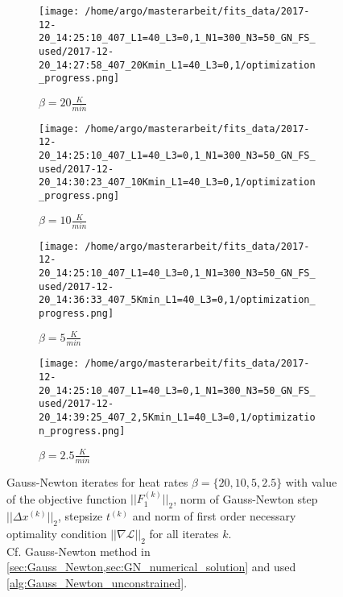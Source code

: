 \documentclass{scrartcl}[12pt, halfparskip]
\numberwithin{equation}{section}
\numberwithin{figure}{section}
\numberwithin{table}{section}
\begin{document}
\begin{figure}[H]
	\begin{subfigure}{0.49\textwidth}
		\texttt{[image: /home/argo/masterarbeit/fits\_data/2017-12-20\_14:25:10\_407\_L1=40\_L3=0,1\_N1=300\_N3=50\_GN\_FS\_used/2017-12-20\_14:27:58\_407\_20Kmin\_L1=40\_L3=0,1/optimization\_progress.png]}
		\caption{$\beta = 20 \frac{K}{min}$}
	\end{subfigure}
	\begin{subfigure}{0.49\textwidth}
		\texttt{[image: /home/argo/masterarbeit/fits\_data/2017-12-20\_14:25:10\_407\_L1=40\_L3=0,1\_N1=300\_N3=50\_GN\_FS\_used/2017-12-20\_14:30:23\_407\_10Kmin\_L1=40\_L3=0,1/optimization\_progress.png]}
		\caption{$\beta = 10 \frac{K}{min}$}
	\end{subfigure}
	\begin{subfigure}{0.49\textwidth}
		\texttt{[image: /home/argo/masterarbeit/fits\_data/2017-12-20\_14:25:10\_407\_L1=40\_L3=0,1\_N1=300\_N3=50\_GN\_FS\_used/2017-12-20\_14:36:33\_407\_5Kmin\_L1=40\_L3=0,1/optimization\_progress.png]}
		\caption{$\beta = 5 \frac{K}{min}$}
	\end{subfigure}
	\begin{subfigure}{0.49\textwidth}
		\texttt{[image: /home/argo/masterarbeit/fits\_data/2017-12-20\_14:25:10\_407\_L1=40\_L3=0,1\_N1=300\_N3=50\_GN\_FS\_used/2017-12-20\_14:39:25\_407\_2,5Kmin\_L1=40\_L3=0,1/optimization\_progress.png]}
		\caption{$\beta = 2.5 \frac{K}{min}$}
	\end{subfigure}
	\caption{Gauss-Newton iterates for heat rates $\beta = \{ 20, 10, 5, 2.5 \}$ with value of the objective function $||F_1^{(k)}||_2$, norm of Gauss-Newton step $||\Delta x^{(k)}||_2$, stepsize $t^{(k)}$ and norm of first order necessary optimality condition $|| \nabla \mathcal{L} ||_2$ for all iterates $k$.  \\
	Cf. Gauss-Newton method in \cref{sec:Gauss_Newton,sec:GN_numerical_solution} and used \cref{alg:Gauss_Newton_unconstrained}.} 
	\label{fig:optimization_progress_FS_1}
\end{figure}
\end{document}

